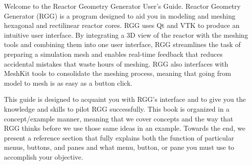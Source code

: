 Welcome to the Reactor Geometry Generator User's Guide.  Reactor Geometry Generator (RGG) is a program designed to aid you in modeling and meshing hexagonal and rectilinear reactor cores.  RGG uses Qt and VTK to produce an intuitive user interface.  By integrating a 3D view of the reactor with the meshing tools and combining them into one user interface, RGG streamlines the task of preparing a simulation mesh and enables real-time feedback that reduces accidental mistakes that waste hours of meshing.  RGG also interfaces with MeshKit tools to consolidate the meshing process, meaning that going from model to mesh is as easy as a button click.

This guide is designed to acquaint you with RGG's interface and to give you the knowledge and skills to pilot RGG successfully.  This book is organized in a concept/example manner, meaning that we cover concepts and the way that RGG thinks before we use those same ideas in an example.  Towards the end, we present a reference section that fully explains both the function of particular menus, buttons, and panes and what menu, button, or pane you must use to accomplish your objective.